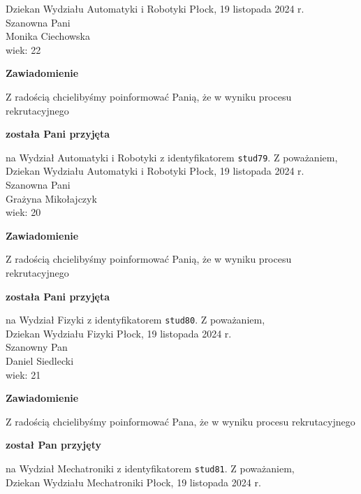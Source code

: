 \documentclass[12pt,a4paper]{article}
\begin{document}
Dziekan
Wydziału Automatyki i Robotyki
\newpage
\hfill Płock, 19 listopada 2024 r. \\
\noindent
Szanowna Pani \\
Monika Ciechowska \\
wiek: 22
\bigskip
\begin{center}
    {\Large\textbf{Zawiadomienie}}
\end{center}
\bigskip 
Z radością chcielibyśmy poinformować Panią, że w wyniku procesu rekrutacyjnego
\begin{center}
\textsf{\textbf{została Pani przyjęta}}
\end{center}
na Wydział Automatyki i Robotyki z identyfikatorem \verb|stud79|. 
\vspace{2cm}
\noindent
Z poważaniem, \\
Dziekan
Wydziału Automatyki i Robotyki
\newpage
\hfill Płock, 19 listopada 2024 r. \\
\noindent
Szanowna Pani \\
Grażyna Mikołajczyk \\
wiek: 20
\bigskip
\begin{center}
    {\Large\textbf{Zawiadomienie}}
\end{center}
\bigskip 
Z radością chcielibyśmy poinformować Panią, że w wyniku procesu rekrutacyjnego
\begin{center}
\textsf{\textbf{została Pani przyjęta}}
\end{center}
na Wydział Fizyki z identyfikatorem \verb|stud80|. 
\vspace{2cm}
\noindent
Z poważaniem, \\
Dziekan
Wydziału Fizyki
\newpage
\hfill Płock, 19 listopada 2024 r. \\
\noindent
Szanowny Pan \\
Daniel Siedlecki \\
wiek: 21
\bigskip
\begin{center}
    {\Large\textbf{Zawiadomienie}}
\end{center}
\bigskip 
Z radością chcielibyśmy poinformować Pana, że w wyniku procesu rekrutacyjnego
\begin{center}
\textsf{\textbf{został Pan przyjęty}}
\end{center}
na Wydział Mechatroniki z identyfikatorem \verb|stud81|. 
\vspace{2cm}
\noindent
Z poważaniem, \\
Dziekan
Wydziału Mechatroniki
\newpage
\hfill Płock, 19 listopada 2024 r. \\
\noindent
\end{document}
